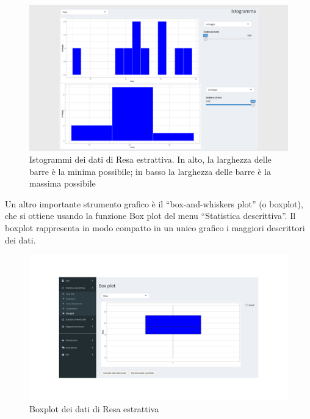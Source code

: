 \documentclass[
  11pt,
]{book}
\begin{document}
\begin{figure}

{\centering \includegraphics[width=1\linewidth]{Immagini/Descrittiva/5_IstogResaestrattiva} 

}

\caption{Istogrammi dei dati di Resa estrattiva. In alto, la larghezza delle barre è la minima possibile; in basso la larghezza delle barre è la massima possibile}\label{fig:sd5}
\end{figure}

Un altro importante strumento grafico è il ``box-and-whiskers plot'' (o boxplot), che si ottiene usando la funzione Box plot del menu ``Statistica descrittiva''. Il boxplot rappresenta in modo compatto in un unico grafico i maggiori descrittori dei dati.

\begin{figure}

{\centering \includegraphics[width=1\linewidth]{Immagini/Descrittiva/6_BoxplotRestrattiva} 

}

\caption{Boxplot dei dati di Resa estrattiva}\label{fig:sd6}
\end{figure}
\end{document}
